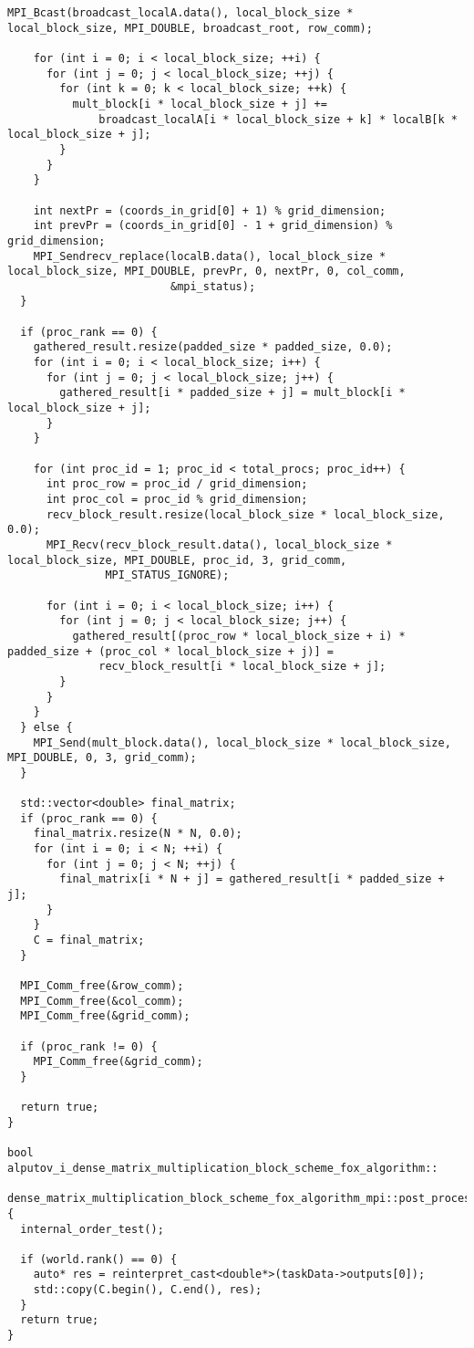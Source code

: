\documentclass{report}
\begin{document}
\begin{lstlisting}[caption={opsmpi.cpp},label=lst:opsmpi2]
    MPI_Bcast(broadcast_localA.data(), local_block_size * local_block_size, MPI_DOUBLE, broadcast_root, row_comm);

    for (int i = 0; i < local_block_size; ++i) {
      for (int j = 0; j < local_block_size; ++j) {
        for (int k = 0; k < local_block_size; ++k) {
          mult_block[i * local_block_size + j] +=
              broadcast_localA[i * local_block_size + k] * localB[k * local_block_size + j];
        }
      }
    }

    int nextPr = (coords_in_grid[0] + 1) % grid_dimension;
    int prevPr = (coords_in_grid[0] - 1 + grid_dimension) % grid_dimension;
    MPI_Sendrecv_replace(localB.data(), local_block_size * local_block_size, MPI_DOUBLE, prevPr, 0, nextPr, 0, col_comm,
                         &mpi_status);
  }

  if (proc_rank == 0) {
    gathered_result.resize(padded_size * padded_size, 0.0);
    for (int i = 0; i < local_block_size; i++) {
      for (int j = 0; j < local_block_size; j++) {
        gathered_result[i * padded_size + j] = mult_block[i * local_block_size + j];
      }
    }

    for (int proc_id = 1; proc_id < total_procs; proc_id++) {
      int proc_row = proc_id / grid_dimension;
      int proc_col = proc_id % grid_dimension;
      recv_block_result.resize(local_block_size * local_block_size, 0.0);
      MPI_Recv(recv_block_result.data(), local_block_size * local_block_size, MPI_DOUBLE, proc_id, 3, grid_comm,
               MPI_STATUS_IGNORE);

      for (int i = 0; i < local_block_size; i++) {
        for (int j = 0; j < local_block_size; j++) {
          gathered_result[(proc_row * local_block_size + i) * padded_size + (proc_col * local_block_size + j)] =
              recv_block_result[i * local_block_size + j];
        }
      }
    }
  } else {
    MPI_Send(mult_block.data(), local_block_size * local_block_size, MPI_DOUBLE, 0, 3, grid_comm);
  }

  std::vector<double> final_matrix;
  if (proc_rank == 0) {
    final_matrix.resize(N * N, 0.0);
    for (int i = 0; i < N; ++i) {
      for (int j = 0; j < N; ++j) {
        final_matrix[i * N + j] = gathered_result[i * padded_size + j];
      }
    }
    C = final_matrix;
  }

  MPI_Comm_free(&row_comm);
  MPI_Comm_free(&col_comm);
  MPI_Comm_free(&grid_comm);

  if (proc_rank != 0) {
    MPI_Comm_free(&grid_comm);
  }

  return true;
}

bool alputov_i_dense_matrix_multiplication_block_scheme_fox_algorithm::
    dense_matrix_multiplication_block_scheme_fox_algorithm_mpi::post_processing() {
  internal_order_test();

  if (world.rank() == 0) {
    auto* res = reinterpret_cast<double*>(taskData->outputs[0]);
    std::copy(C.begin(), C.end(), res);
  }
  return true;
}
\end{lstlisting}
\end{document}
